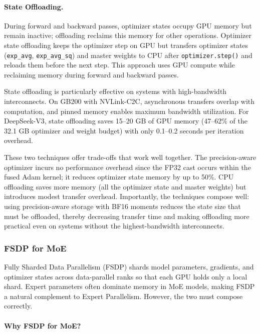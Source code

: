 \documentclass[10pt,logo,copyright]{nvidiatechreport}
\begin{document}
\paragraph{State Offloading.}
During forward and backward passes, optimizer states occupy GPU memory but remain inactive; offloading reclaims this memory for other operations. Optimizer state offloading keeps the optimizer step on GPU but transfers optimizer states (\texttt{exp\_avg}, \texttt{exp\_avg\_sq}) and master weights to CPU after \texttt{optimizer.step()} and reloads them before the next step. This approach uses GPU compute while reclaiming memory during forward and backward passes.

State offloading is particularly effective on systems with high-bandwidth interconnects. On GB200 with NVLink-C2C, asynchronous transfers overlap with computation, and pinned memory enables maximum bandwidth utilization. For DeepSeek-V3, state offloading saves 15--20 GB of GPU memory (47--62\% of the 32.1 GB optimizer and weight budget) with only 0.1--0.2 seconds per iteration overhead.

These two techniques offer trade-offs that work well together. The precision-aware optimizer incurs no performance overhead since the FP32 cast occurs within the fused Adam kernel; it reduces optimizer state memory by up to 50\%. CPU offloading saves more memory (all the optimizer state and master weights) but introduces modest transfer overhead. Importantly, the techniques compose well: using precision-aware storage with BF16 moments reduces the state size that must be offloaded, thereby decreasing transfer time and making offloading more practical even on systems without the highest-bandwidth interconnects.

\subsubsection{FSDP for MoE}\label{sec:fsdp-ref}

Fully Sharded Data Parallelism (FSDP) \cite{zhao2023pytorchfsdp,rajbhandari2020zero} shards model parameters, gradients, and optimizer states across data-parallel ranks so that each GPU holds only a local shard. Expert parameters often dominate memory in MoE models, making FSDP a natural complement to Expert Parallelism. However, the two must compose correctly.

\paragraph{Why FSDP for MoE?}
\end{document}
